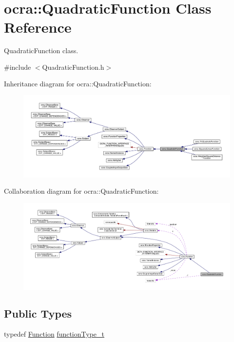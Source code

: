 \hypertarget{classocra_1_1QuadraticFunction}{}\section{ocra\+:\+:Quadratic\+Function Class Reference}
\label{classocra_1_1QuadraticFunction}


Quadratic\+Function class.  




{\ttfamily \#include $<$Quadratic\+Function.\+h$>$}



Inheritance diagram for ocra\+:\+:Quadratic\+Function\+:\nopagebreak
\begin{figure}[H]
\begin{center}
\leavevmode
\includegraphics[width=350pt]{d7/d45/classocra_1_1QuadraticFunction__inherit__graph}
\end{center}
\end{figure}


Collaboration diagram for ocra\+:\+:Quadratic\+Function\+:\nopagebreak
\begin{figure}[H]
\begin{center}
\leavevmode
\includegraphics[width=350pt]{d2/deb/classocra_1_1QuadraticFunction__coll__graph}
\end{center}
\end{figure}
\subsection*{Public Types}
\begin{DoxyCompactItemize}
\item 
typedef \hyperlink{classocra_1_1Function}{Function} \hyperlink{classocra_1_1QuadraticFunction_a224eecd300c5a16599ebd6e4eff5d9d7}{function\+Type\+\_\+t}
\end{DoxyCompactItemize}
